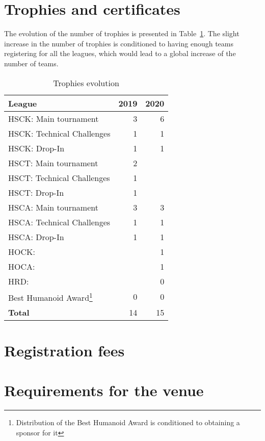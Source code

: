 \documentclass{article}
\begin{document}
\section{Trophies and certificates}

The evolution of the number of trophies is presented in
Table~\ref{tab:trophies}.
The slight increase in the number of trophies is conditioned to having enough
teams registering for all the leagues, which would lead to a global increase of
the number of teams.
\begin{table}[h]
  \centering
  \caption{\label{tab:trophies}Trophies evolution}
  \begin{tabular}{l | r | r}
    League & 2019 & 2020\\
    \hline
    HSCK: Main tournament & 3 & 6\\ 
    HSCK: Technical Challenges & 1 & 1\\
    HSCK: Drop-In & 1 & 1\\
    HSCT: Main tournament & 2 & \\ 
    HSCT: Technical Challenges & 1 & \\
    HSCT: Drop-In & 1 & \\
    HSCA: Main tournament & 3 & 3\\ 
    HSCA: Technical Challenges & 1 & 1\\
    HSCA: Drop-In & 1 & 1\\
    HOCK: &  & 1\\
    HOCA: &  & 1\\ 
    HRD: &  & 0\\
    Best Humanoid Award\footnote{Distribution of the Best Humanoid Award is conditioned to obtaining a sponsor for it} & 0 & 0\\
    \hline
    \textbf{Total} & 14 & 15
  \end{tabular}
\end{table}

\section{Registration fees}

\section{Requirements for the venue}
\end{document}
